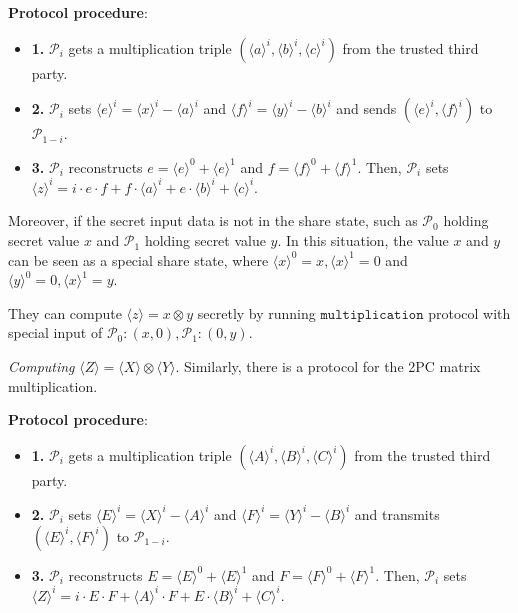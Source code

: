 \documentclass[letterpaper]{article} %
\begin{document}
    \textbf{Protocol procedure}:
    \begin{itemize}
        \item \textbf{1.} $\mathcal{P}_{i}$ gets a multiplication triple 
        $(\langle a\rangle ^{i},\langle b\rangle ^{i},\langle c\rangle ^{i})$ from the trusted third party.
        \item \textbf{2.} $\mathcal{P}_{i}$ sets $\langle e\rangle ^{i}=\langle x\rangle ^{i}-\langle a\rangle ^{i}$ and $\langle f\rangle ^{i}=\langle y\rangle ^{i}-\langle b\rangle ^{i}$
        and sends $(\langle e\rangle ^{i},\langle f\rangle ^{i})$ to $\mathcal{P}_{1-i}$.
        \item \textbf{3.} $\mathcal{P}_{i}$ reconstructs $e = \langle e\rangle ^{0}+\langle e\rangle ^{1}$ and $f = \langle f\rangle ^{0}+\langle f\rangle ^{1}$. 
        Then, $\mathcal{P}_{i}$ sets $\langle z\rangle^{i}=i\cdot e \cdot f + f\cdot \langle a\rangle^{i}+e \cdot \langle b\rangle^{i} + \langle c\rangle^{i}$.
    
    \end{itemize}
    
    
    Moreover, if the secret input data is not in the share state,
    such as $\mathcal{P}_{0}$ holding secret value $x$
    and $\mathcal{P}_{1}$ holding secret value $y$.
    In this situation, the value $x$ and $y$ can be
    seen as a special share state, where
    $\langle x\rangle ^{0}=x,\langle x\rangle ^{1}=0$ and 
    $\langle y\rangle ^{0}=0,\langle x\rangle ^{1}=y$.

    They can compute $\langle z\rangle=x\otimes y$ secretly
    by running $\mathtt{multiplication}$ protocol with special input of 
    $\mathcal{P}_{0}:(x,0),\mathcal{P}_{1}:(0,y)$.
   



    \emph{Computing} $ \langle Z\rangle  = \langle X\rangle  \otimes \langle Y\rangle$.
    Similarly, there is a protocol for the 2PC matrix multiplication.

    \textbf{Protocol procedure}:
    \begin{itemize}
        \item \textbf{1.} $\mathcal{P}_{i}$ gets a multiplication triple 
        $(\langle A\rangle ^{i},\langle B\rangle ^{i},\langle C\rangle ^{i})$ from the trusted third party.
        \item \textbf{2.} $\mathcal{P}_{i}$ sets $\langle E\rangle ^{i}=\langle X\rangle ^{i}-\langle A\rangle ^{i}$ and $\langle F\rangle ^{i}=\langle Y\rangle ^{i}-\langle B\rangle ^{i}$
        and transmits $(\langle E\rangle ^{i},\langle F\rangle ^{i})$ to $\mathcal{P}_{1-i}$.
        \item \textbf{3.} $\mathcal{P}_{i}$ reconstructs $E = \langle E\rangle ^{0}+\langle E\rangle ^{1}$ and $F = \langle F\rangle ^{0}+\langle F\rangle ^{1}$. 
        Then, $\mathcal{P}_{i}$ sets $\langle Z\rangle^{i}=i\cdot E \cdot F + \langle A\rangle^{i} \cdot F + E \cdot \langle B\rangle^{i} + \langle C\rangle^{i}$.
    
    \end{itemize}
    
\end{document}
